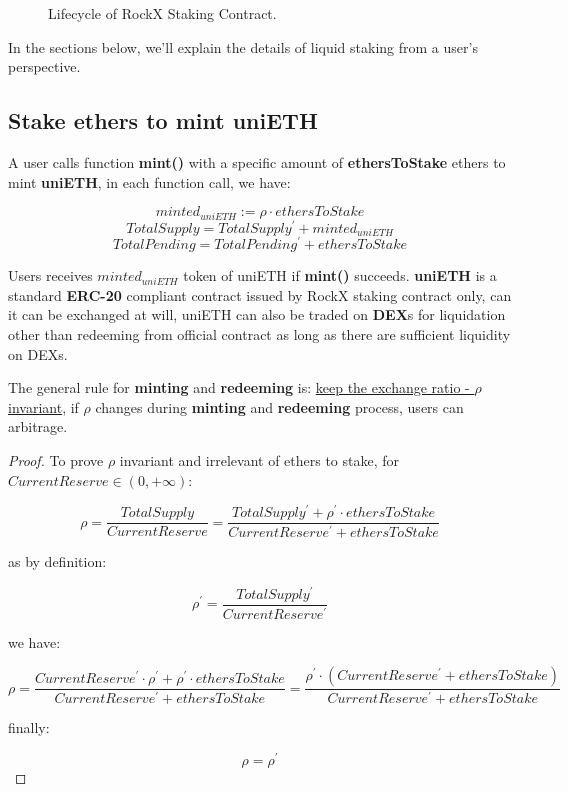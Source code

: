 \documentclass{article}
\begin{document}
\begin{figure}
\begin{center}
\end{center}
\caption{Lifecycle of RockX Staking Contract.}
\end{figure}

In the sections below, we'll explain the details of liquid staking from a user's perspective.

\subsection{Stake ethers to mint uniETH}
A user calls function \textbf{mint()} with a specific amount of \textbf{ethersToStake} ethers to mint \textbf{uniETH}, in each function call, we have:

\begin{theorem}
\label{Mint}
\[minted_{uniETH} := \rho \cdot ethersToStake \]
\[TotalSupply = TotalSupply^{\prime} + minted_{uniETH} \]
\[TotalPending = TotalPending^{\prime} + ethersToStake\]
\end{theorem}

Users receives \underline{$minted_{uniETH}$} token of uniETH  if \textbf{mint()} succeeds. \textbf{uniETH} is a standard \textbf{ERC-20} compliant contract issued by RockX staking contract only, can it can be exchanged at will, uniETH can also be traded on \textbf{DEX}s for liquidation other than redeeming from official contract as long as there are sufficient liquidity on DEXs.

The general rule for \textbf{minting} and \textbf{redeeming} is: \underline{keep the exchange ratio - $\rho$ invariant}, if $\rho$ changes during \textbf{minting} and \textbf{redeeming} process, users can arbitrage.

\begin{proof}
To prove $\rho$ invariant and irrelevant of ethers to stake, for $CurrentReserve \in (0, +\infty)$:

\[\rho = \frac{TotalSupply}{CurrentReserve} = \frac{TotalSupply^{\prime} + \rho^{\prime} \cdot ethersToStake}{CurrentReserve^{\prime} + ethersToStake}\]

as by definition:

\[\rho^{\prime} = \frac{TotalSupply^{\prime}}{CurrentReserve^{\prime}}\]

we have:

\[\rho=\frac{CurrentReserve^{\prime} \cdot \rho^{\prime}  + \rho^{\prime} \cdot ethersToStake}{CurrentReserve^{\prime} + ethersToStake} = \frac{\rho^{\prime} \cdot (CurrentReserve^{\prime} + ethersToStake)}{CurrentReserve^{\prime} + ethersToStake} \]

finally:

\[\rho = \rho^{\prime}\]

\end{proof}
\end{document}
